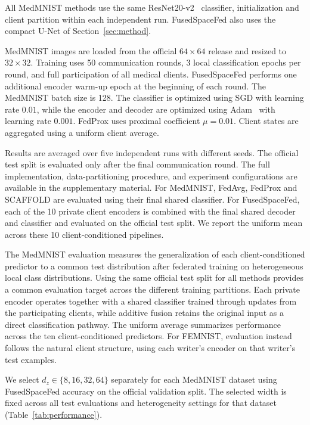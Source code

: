 \documentclass[twoside]{article}
\newcommand{\coauthorcolor}{}
\newenvironment{coauthorrevision}{\par\begingroup\coauthorcolor}{\par\endgroup}
\theoremstyle{thmstyleone}%
\theoremstyle{thmstyletwo}%
\theoremstyle{thmstylethree}%
\begin{document}
All MedMNIST methods use the same ResNet20-v2~\cite{he2016identity} classifier,
initialization and client partition within each independent run. FusedSpaceFed
also uses the compact U-Net of Section~\ref{sec:method}.

MedMNIST images are loaded from the official $64\times64$ release and resized
to $32\times32$. Training uses 50 communication rounds, 3 local classification
epochs per round, and full participation of all medical clients.
FusedSpaceFed performs one additional encoder warm-up epoch at the beginning of
each round. The MedMNIST batch size is 128. The classifier is optimized using
SGD with learning rate $0.01$, while the encoder and decoder are optimized
using Adam~\cite{kingma2015adam} with learning rate $0.001$. FedProx uses proximal coefficient
$\mu=0.01$. Client states are aggregated using a uniform client average.

Results are averaged over five independent runs with different seeds. The official test split is evaluated only after the
final communication round. The full implementation, data-partitioning procedure, and experiment configurations are available in the supplementary material.
For MedMNIST, FedAvg, FedProx and SCAFFOLD are evaluated using their final
shared classifier. For FusedSpaceFed, each of the 10 private client encoders is
combined with the final shared decoder and classifier and evaluated on the
official test split. We report the uniform
mean across these 10 client-conditioned pipelines.

\begin{coauthorrevision}
The MedMNIST evaluation measures the generalization of each client-conditioned
predictor to a common test distribution after federated training on
heterogeneous local class distributions. Using the same official test split
for all methods provides a common evaluation target across the different
training partitions. Each private encoder operates together with a shared
classifier trained through updates from the participating clients, while
additive fusion retains the original input as a direct classification pathway.
The uniform average summarizes performance across the ten client-conditioned
predictors. For FEMNIST, evaluation instead follows the natural client
structure, using each writer's encoder on that writer's test examples.
\end{coauthorrevision}

We select $d_z\in\{8,16,32,64\}$ separately for each MedMNIST dataset using
FusedSpaceFed accuracy on the official validation split. The selected width
is fixed across all test evaluations and heterogeneity settings for that
dataset (Table~\ref{tab:performance}).
\end{document}
